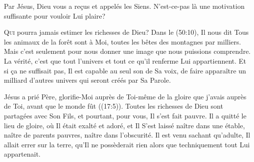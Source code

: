Par Jésus, Dieu vous a re\c{c}us et appelés les Siens.
 N'est-ce-pas là une motivation suffisante pour vouloir Lui plaire?

\dvrule







\lettrine{Q}{ui} pourra jamais estimer les richesses de Dieu?
 Dans le (50:10), Il nous dit\frcolon{} 
 \Og Tous les animaux de la forêt sont à Moi,
 toutes les bêtes des montagnes par milliers. \Fg{}
 Mais c'est seulement pour nous donner une image que nous puissions comprendre.
 La vérité, c'est que tout l'univers et tout ce qu'il renferme
 Lui appartiennent. Et si \c{c}a ne suffisait pas, Il est capable au seul son
 de Sa voix, de faire apparaître un milliard d'autres univers
 qui seront créés par Sa Parole.

Jésus a prié\frcolon{} 
 \Og Père, glorifie-Moi auprès de Toi-même de la gloire
 que j'avais auprès de Toi, avant que le monde fût \Fg{}
 ((17:5)).
 Toutes les richesses de Dieu sont partagées avec Son Fils, et pourtant,
 pour vous, Il s'est fait pauvre. Il a quitté le lieu de gloire,
 où Il était exalté et adoré, et Il S'est laissé naître dans une étable,
 naître de parents pauvres, naître dans l'obscurité.
 Il est venu sachant qu'adulte, Il allait errer sur la terre,
 qu'Il ne possèderait rien alors que techniquement tout Lui appartenait.


